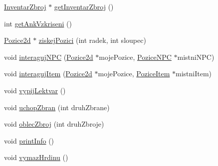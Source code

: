 \begin{DoxyCompactItemize}
\item 
\hyperlink{class_inventar_zbroj}{Inventar\-Zbroj} $\ast$ \hyperlink{class_hrdina_a3bbc7d24d46551d15f76afb8b365c26f}{get\-Inventar\-Zbroj} ()
\item 
int \hyperlink{class_hrdina_a3ef2dba4d1f17cd04a27147b64bd7048}{get\-Ank\-Vzkriseni} ()
\item 
\hyperlink{struct_pozice2d}{Pozice2d} $\ast$ \hyperlink{class_hrdina_a1c5af9bbbca5775ecd98a802ec65b53d}{ziskej\-Pozici} (int radek, int sloupec)
\item 
void \hyperlink{class_hrdina_a79d32ca76bfecef2ccf925192e4ecdc9}{interaguj\-N\-P\-C} (\hyperlink{struct_pozice2d}{Pozice2d} $\ast$moje\-Pozice, \hyperlink{class_pozice_n_p_c}{Pozice\-N\-P\-C} $\ast$mistni\-N\-P\-C)
\item 
void \hyperlink{class_hrdina_adf8d0eebfc7760699f1b074a94c8711f}{interaguj\-Item} (\hyperlink{struct_pozice2d}{Pozice2d} $\ast$moje\-Pozice, \hyperlink{class_pozice_item}{Pozice\-Item} $\ast$mistni\-Item)
\item 
void \hyperlink{class_hrdina_ad85efc293485f0b73cb925fac35d50bb}{vypij\-Lektvar} ()
\item 
void \hyperlink{class_hrdina_a4a0625eb616f0a2bfbdb7f210cf71912}{uchop\-Zbran} (int druh\-Zbrane)
\item 
void \hyperlink{class_hrdina_adb743bd1051a32b775d4fd8a85d961ea}{oblec\-Zbroj} (int druh\-Zbroje)
\item 
void \hyperlink{class_hrdina_aef7225c90a6e5b084a1f382a3591a32f}{print\-Info} ()
\item 
void \hyperlink{class_hrdina_aed8c103f84ed06303e1a8f792650823f}{vymaz\-Hrdinu} ()
\end{DoxyCompactItemize}


